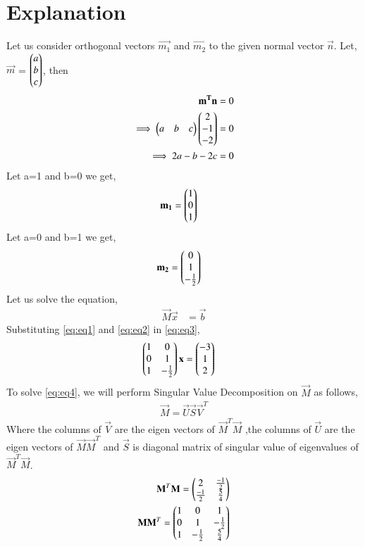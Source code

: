 \documentclass[journal,12pt,twocolumn]{IEEEtran}
\begin{document}
\section{Explanation}
Let us consider orthogonal vectors $\vec{m_1}$ and $\vec{m_2}$ to the given normal vector $\vec{n}$. Let, $\vec{m}$ = $\begin{pmatrix}a\\b\\c\end{pmatrix}$, then
\begin{align}
\mathbf{m^T}\mathbf{n} &= 0\\
\implies\begin{pmatrix}a&b&c\end{pmatrix}\begin{pmatrix}2\\-1\\-2\end{pmatrix} &= 0\\
\implies2a-b-2c &= 0
\end{align}
Let a=1 and b=0 we get,
\begin{align}
\mathbf{m_1} &= \begin{pmatrix}1\\0\\1\end{pmatrix} \label{eq:eq1}
\end{align}
Let a=0 and b=1 we get,
\begin{align}
\mathbf{m_2} &= \begin{pmatrix}0\\1\\-\frac{1}{2}\end{pmatrix} \label{eq:eq2}
\end{align}
Let us solve the equation,
\begin{align}
\vec{M}\vec{x} &= \vec{b}\label{eq:eq3}
\end{align}
Substituting \eqref{eq:eq1} and \eqref{eq:eq2} in \eqref{eq:eq3},
\begin{align}
    \begin{pmatrix}1&0\\0&1\\1&-\frac{1}{2}\end{pmatrix}\mathbf{x} &= \begin{pmatrix}-3\\1\\2\end{pmatrix}\label{eq:eq4}
\end{align}
To solve \eqref{eq:eq4}, we will perform Singular Value Decomposition on $\vec{M}$ as follows,
\begin{align}
\vec{M}=\vec{U}\vec{S}\vec{V}^T\label{eq:eq5}
\end{align}
Where the columns of $\vec{V}$ are the eigen vectors of $\vec{M}^T\vec{M}$ ,the columns of $\vec{U}$ are the eigen vectors of $\vec{M}\vec{M}^T$ and $\vec{S}$ is diagonal matrix of singular value of eigenvalues of $\vec{M}^T\vec{M}$.
\begin{align}
\mathbf{M}^T\mathbf{M}=\begin{pmatrix}2&\frac{-1}{2}\\\frac{-1}{2}&\frac{5}{4}\end{pmatrix}\label{eq:eq6}\\
\mathbf{M}\mathbf{M}^T=\begin{pmatrix}1&0&1\\0&1&-\frac{1}{2}\\1&-\frac{1}{2}&\frac{5}{4}\end{pmatrix}
\end{align}
\end{document}
